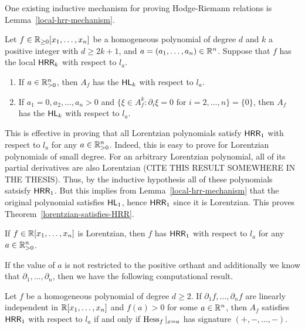 \documentclass{puthesis-UG}
\begin{document}
One existing inductive mechanism for proving Hodge-Riemann relations is Lemma~\ref{local-hrr-mechanism}. 

\begin{lem}  \label{local-hrr-mechanism}
	Let $f \in \mathbb{R}_{\geq 0}[x_1, \ldots, x_n]$ be a homogeneous polynomial of degree $d$ and $k$ a positive integer with $d \geq 2k+1$, and $a = (a_1, \ldots, a_n) \in \mathbb{R}^n$. Suppose that $f$ has the local $\mathsf{HRR}_k$ with respect to $l_a$. 
	\begin{enumerate}[label = (\roman*)]
		\item If $a \in \mathbb{R}_{> 0}^n$, then $A_f$ has the $\mathsf{HL}_k$ with respect to $l_a$. 
		\item If $a_1 = 0, a_2, \ldots, a_n > 0$ and $\{\xi \in A_f^k : \partial_i \xi = 0 \text{ for $i = 2, \ldots, n$}\} = \{0\}$, then $A_f$ has the $\mathsf{HL}_k$ with respect to $l_a$. 
	\end{enumerate}
\end{lem}

This is effective in proving that all Lorentzian polynomials satisfy $\mathsf{HRR}_1$ with respect to $l_a$ for any $a \in \mathbb{R}^n_{> 0}$. Indeed, this is easy to prove for Lorentzian polynomials of small degree. For an arbitrary Lorentzian polynomial, all of its partial derivatives are also Lorentzian (CITE THIS RESULT SOMEWHERE IN THE THESIS). Thus, by the inductive hypothesis all of these polynomials satsisfy $\mathsf{HRR}_1$. But this implies from Lemma~\ref{local-hrr-mechanism} that the original polynomial satisfies $\mathsf{HL}_1$, hence $\mathsf{HRR}_1$ since it is Lorentzian. This proves Theorem~\ref{lorentzian-satisfies-HRR}.

\begin{thm}  \label{lorentzian-satisfies-HRR}
	If $f \in \mathbb{R}[x_1, \ldots, x_n]$ is Lorentzian, then $f$ has $\mathsf{HRR}_1$ with respect to $l_a$ for any $a \in \mathbb{R}_{> 0}^n$. 
\end{thm}

If the value of $a$ is not restricted to the positive orthant and additionally we know that $\partial_1, \ldots, \partial_n$, then we have the following computational result. 

\begin{cor} \label{partial-independent-implies-hessian}
	Let $f$ be a homogeneous polynomial of degree $d \geq 2$. If $\partial_1 f, \ldots, \partial_n f$ are linearly independent in $\mathbb{R}[x_1, \ldots, x_n]$ and $f(a) > 0$ for some $a \in \mathbb{R}^n$, then $A_f$ satisfies $\mathsf{HRR}_1$ with respect to $l_a$ if and only if $\operatorname{Hess}_f|_{x = a}$ has signature $(+, -, \ldots, -)$. 
\end{cor}
\end{document}
